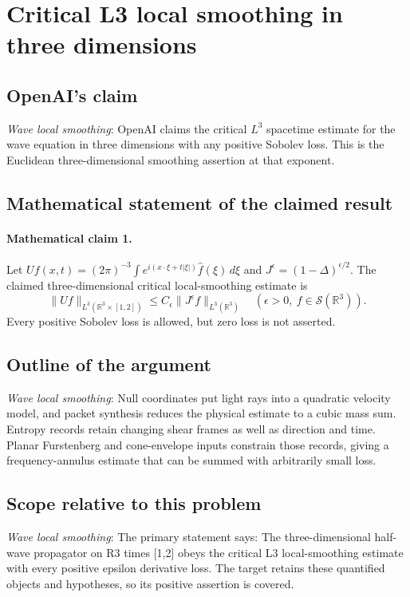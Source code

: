 \documentclass[11pt]{article}
\begin{document}
\section*{Critical L3 local smoothing in three dimensions}

\subsection{OpenAI's claim}
\textit{Wave local smoothing}: OpenAI claims the critical $L^3$ spacetime estimate for the wave equation in three dimensions with any positive Sobolev loss. This is the Euclidean three-dimensional smoothing assertion at that exponent.

\subsection{Mathematical statement of the claimed result}
\paragraph{Mathematical claim 1.} Let $Uf(x,t)=(2\pi)^{-3}\int e^{i(x\cdot\xi+t|\xi|)}\widehat f(\xi)\,d\xi$ and $J^\epsilon=(1-\Delta)^{\epsilon/2}$. The claimed three-dimensional critical local-smoothing estimate is \[\|Uf\|_{L^3(\mathbb R^3\times[1,2])}\le C_\epsilon\|J^\epsilon f\|_{L^3(\mathbb R^3)}\quad(\epsilon>0,\ f\in\mathcal S(\mathbb R^3)).\] Every positive Sobolev loss is allowed, but zero loss is not asserted.

\subsection{Outline of the argument}
\textit{Wave local smoothing}: Null coordinates put light rays into a quadratic velocity model, and packet synthesis reduces the physical estimate to a cubic mass sum. Entropy records retain changing shear frames as well as direction and time. Planar Furstenberg and cone-envelope inputs constrain those records, giving a frequency-annulus estimate that can be summed with arbitrarily small loss.

\subsection{Scope relative to this problem}
\textit{Wave local smoothing}: The primary statement says: The three-dimensional half-wave propagator on R3 times [1,2] obeys the critical L3 local-smoothing estimate with every positive epsilon derivative loss. The target retains these quantified objects and hypotheses, so its positive assertion is covered.
\end{document}
